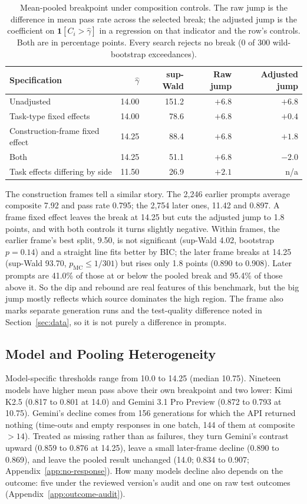 \documentclass{article}
\begin{document}
\begin{table}[h]
\centering
\caption{Mean-pooled breakpoint under composition controls. The raw jump is the difference in mean pass rate across the selected break; the adjusted jump is the coefficient on $\mathbf{1}[C_i>\hat{\gamma}]$ in a regression on that indicator and the row's controls. Both are in percentage points. Every search rejects no break (0 of 300 wild-bootstrap exceedances).}
\label{tab:task-type}
\begin{tabular}{@{}lrrrr@{}}
\toprule
Specification & $\hat{\gamma}$ & sup-Wald & Raw jump & Adjusted jump \\
\midrule
Unadjusted & 14.00 & 151.2 & $+6.8$ & $+6.8$ \\
Task-type fixed effects & 14.00 & 78.6 & $+6.8$ & $+0.4$ \\
Construction-frame fixed effect & 14.25 & 88.4 & $+6.8$ & $+1.8$ \\
Both & 14.25 & 51.1 & $+6.8$ & $-2.0$ \\
Task effects differing by side & 11.50 & 26.9 & $+2.1$ & n/a \\
\bottomrule
\end{tabular}
\end{table}

The construction frames tell a similar story. The 2{,}246 earlier prompts average composite 7.92 and pass rate 0.795; the 2{,}754 later ones, 11.42 and 0.897. A frame fixed effect leaves the break at 14.25 but cuts the adjusted jump to 1.8 points, and with both controls it turns slightly negative. Within frames, the earlier frame's best split, 9.50, is not significant (sup-Wald 4.02, bootstrap $p=0.14$) and a straight line fits better by BIC; the later frame breaks at 14.25 (sup-Wald 93.70, $p_{\mathrm{MC}}\leq1/301$) but rises only 1.8 points (0.890 to 0.908). Later prompts are 41.0\% of those at or below the pooled break and 95.4\% of those above it. So the dip and rebound are real features of this benchmark, but the big jump mostly reflects which source dominates the high region. The frame also marks separate generation runs and the test-quality difference noted in Section~\ref{sec:data}, so it is not purely a difference in prompts.

\subsection{Model and Pooling Heterogeneity}

Model-specific thresholds range from 10.0 to 14.25 (median 10.75). Nineteen models have higher mean pass above their own breakpoint and two lower: Kimi K2.5 (0.817 to 0.801 at 14.0) and Gemini 3.1 Pro Preview (0.872 to 0.793 at 10.75). Gemini's decline comes from 156 generations for which the API returned nothing (time-outs and empty responses in one batch, 144 of them at composite $>14$). Treated as missing rather than as failures, they turn Gemini's contrast upward (0.859 to 0.876 at 14.25), leave a small later-frame decline (0.890 to 0.869), and leave the pooled result unchanged (14.0; 0.834 to 0.907; Appendix~\ref{app:no-response}). How many models decline also depends on the outcome: five under the reviewed version's audit and one on raw test outcomes (Appendix~\ref{app:outcome-audit}).
\end{document}
